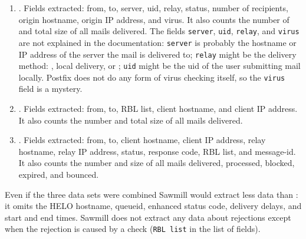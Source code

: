 \begin{enumerate}

    \item
        .
        Fields extracted: from, to, server, uid, relay, status, number of
        recipients, origin hostname, origin IP address, and virus.  It
        also counts the number of and total size of all mails delivered.
        The fields \texttt{server}, \texttt{uid}, \texttt{relay}, and
        \texttt{virus} are not explained in the documentation:
        \texttt{server} is probably the hostname or IP address of the
        server the mail is delivered to; \texttt{relay} might be the
        delivery method: , local delivery, or ;
        \texttt{uid} might be the uid of the user submitting mail locally.
        Postfix does not do any form of virus checking itself, so the
        \texttt{virus} field is a mystery.

    \item
        .
        Fields extracted: from, to, RBL list, client hostname, and client
        IP address.  It also counts the number and total size of all mails
        delivered.

    \item
        .
        Fields extracted: from, to, client hostname, client IP address,
        relay hostname, relay IP address, status, response code, RBL list,
        and message-id.  It also counts the number and size of all mails
        delivered, processed, blocked, expired, and bounced.

\end{enumerate}

Even if the three data sets were combined Sawmill would extract less data
than \parsername{}: it omits the HELO hostname, queueid, enhanced status
code, delivery delays, and start and end times.  Sawmill does not extract
any data about rejections except when the rejection is caused by a
 check (\texttt{RBL list} in the list of fields).

